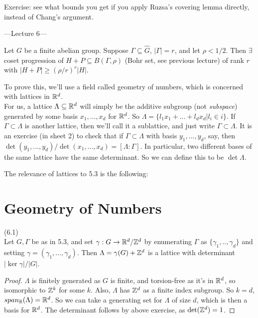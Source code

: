 \documentclass[a4paper]{article}
\begin{document}
Exercise: see what bounds you get if you apply Ruzsa's covering lemma directly, instead of Chang's argument.

---Lecture 6---

\begin{prop}
    Let $G$ be a finite abelian group. Suppose $\Gamma \subseteq \hat{G}$, $|\Gamma| = r$, and let $\rho < 1/2$. Then $\exists$ coset progression of $H+P \subseteq B(\Gamma,\rho)$ (Bohr set, see previous lecture) of rank $r$ with $|H+P| \geq (\rho/r)^r |H|$.
\end{prop}

To prove this, we'll use a field called geometry of numbers, which is concerned with lattices in $\mathbb{R}^d$.\\
For us, a lattice $\Lambda \subseteq \mathbb{R}^d$ will simply be the additive subgroup (not \emph{subspace}) generated by some basis $x_1,...,x_d$ for $\mathbb{R}^d$. So $\Lambda = \{l_1x_1+...+l_dx_d|l_i \in i\}$. If $\Gamma \subset \Lambda$ is another lattice, then we'll call it a sublattice, and just write $\Gamma \subset \Lambda$. It is an exercise (in sheet 2) to check that if $\Gamma \subset \Lambda$ with basis $y_1,...,y_d$, say, then $\det(y_1,...,y_d)/\det(x_1,...,x_d) = [\Lambda : \Gamma]$. In particular, two different bases of the same lattice have the same determinant. So we can define this to be $\det \Lambda$.

The relevance of lattices to 5.3 is the following:

\newpage

\section{Geometry of Numbers}

\begin{lemma} (6.1)\\
    Let $G,\Gamma$ be as in 5.3, and set $\gamma: G \to \mathbb{R}^d / \mathbb{Z}^d$ by enumerating $\Gamma$ as $\{\gamma_1,..,\gamma_d\}$ and setting $\gamma = (\gamma_1,...,\gamma_d)$. Then $\Lambda = \gamma(G) + \mathbb{Z}^d$ is a lattice with determinant $|\ker \gamma| / |G|$.
    \begin{proof}
        $\Lambda$ is finitely generated as $G$ is finite, and torsion-free as it's in $\mathbb{R}^d$, so isomorphic to $\mathbb{Z}^k$ for some $k$. Also, $\Lambda$ has $\mathbb{Z}^d$ as a finite index subgroup. So $k=d$, $span_{\mathbb{R}}(\Lambda) = \mathbb{R}^d$. So we can take a generating set for $\Lambda$ of size $d$, which is then a basis for $\mathbb{R}^d$. The determinant follows by above exercise, as $\det(\mathbb{Z}^d)=1$.
    \end{proof}
\end{lemma}
\end{document}
